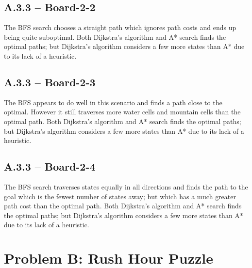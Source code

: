 
\newpage
\subsection*{A.3.3 -- Board-2-2}

The \ac{BFS} search chooses a straight path which ignores path costs and ends up being quite suboptimal. Both Dijkstra's algorithm and A* search finds the optimal paths; but Dijkstra's algorithm considers a few more states than A* due to its lack of a heuristic.


\newpage
\subsection*{A.3.3 -- Board-2-3}

The \ac{BFS} appears to do well in this scenario and finds a path close to the optimal. However it still traverses more water cells and mountain cells than the optimal path. Both Dijkstra's algorithm and A* search finds the optimal paths; but Dijkstra's algorithm considers a few more states than A* due to its lack of a heuristic.


\newpage
\subsection*{A.3.3 -- Board-2-4}

The \ac{BFS} search traverses states equally in all directions and finds the path to the goal which is the fewest number of states away; but which has a much greater path cost than the optimal path. Both Dijkstra's algorithm and A* search finds the optimal paths; but Dijkstra's algorithm considers a few more states than A* due to its lack of a heuristic.


\newpage
\section*{Problem B: Rush Hour Puzzle}

